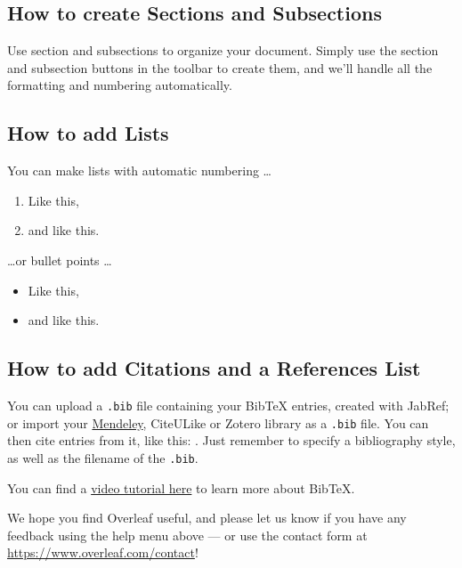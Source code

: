 \documentclass[10pt, a4paper]{article}
\begin{document}
\subsection{How to create Sections and Subsections}

Use section and subsections to organize your document. Simply use the section and subsection buttons in the toolbar to create them, and we'll handle all the formatting and numbering automatically.

\subsection{How to add Lists}

You can make lists with automatic numbering \dots

\begin{enumerate}
\item Like this,
\item and like this.
\end{enumerate}
\dots or bullet points \dots
\begin{itemize}
\item Like this,
\item and like this.
\end{itemize}

\subsection{How to add Citations and a References List}

You can upload a \verb|.bib| file containing your BibTeX entries, created with JabRef; or import your \href{https://www.overleaf.com/blog/184}{Mendeley}, CiteULike or Zotero library as a \verb|.bib| file. You can then cite entries from it, like this: \cite{greenwade93}. Just remember to specify a bibliography style, as well as the filename of the \verb|.bib|.

You can find a \href{https://www.overleaf.com/help/97-how-to-include-a-bibliography-using-bibtex}{video tutorial here} to learn more about BibTeX.

We hope you find Overleaf useful, and please let us know if you have any feedback using the help menu above --- or use the contact form at \url{https://www.overleaf.com/contact}!

\newpage

% 

\end{document}
